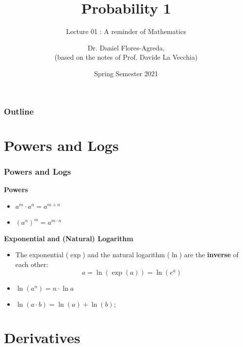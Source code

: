 \documentclass[notes=show, handout]{beamer}\usepackage[]{graphicx}\usepackage[]{color}
\begin{document}
\title[S110015]{Probability 1}
\subtitle{Lecture 01 : A reminder of Mathematics}
\author[Flores-Agreda, La Vecchia]{Dr. Daniel Flores-Agreda, \\[0.5em] \tiny{(based on the notes of Prof. Davide La Vecchia)}}
\date{Spring Semester 2021}

\begin{frame}
\titlepage
\end{frame}

\begin{frame}
\frametitle{Outline}
\tableofcontents
\end{frame}

\section{Powers and Logs}

\begin{frame}
\frametitle{Powers and Logs}


\textbf{Powers}

\vspace{0.2cm}

\begin{itemize}
\item $a^m \cdot a^n = a^{m+n}$
\item $(a^n)^m = a^{m \cdot n}$
\end{itemize}

\pause

\vspace{0.2cm}

\textbf{Exponential and (Natural) Logarithm}

\vspace{0.2cm}

\begin{itemize}
\item The exponential ($\exp$) and the natural logarithm ($\ln$) are the \textbf{inverse} of each other: $$a= \ln(\exp (a) ) = \ln(e^a)$$
\pause
\item $\ln(a^n) = n \cdot \ln a$
\item $\ln (a \cdot b) = \ln (a) + \ln (b)$;
\end{itemize}

\end{frame}



\section{Derivatives}
\end{document}
